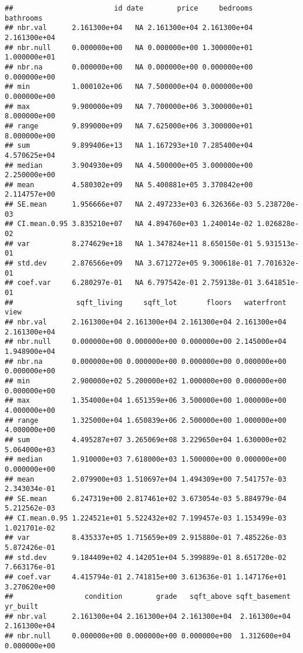\documentclass[
]{article}
\begin{document}
\begin{verbatim}
##                        id date        price     bedrooms    bathrooms
## nbr.val      2.161300e+04   NA 2.161300e+04 2.161300e+04 2.161300e+04
## nbr.null     0.000000e+00   NA 0.000000e+00 1.300000e+01 1.000000e+01
## nbr.na       0.000000e+00   NA 0.000000e+00 0.000000e+00 0.000000e+00
## min          1.000102e+06   NA 7.500000e+04 0.000000e+00 0.000000e+00
## max          9.900000e+09   NA 7.700000e+06 3.300000e+01 8.000000e+00
## range        9.899000e+09   NA 7.625000e+06 3.300000e+01 8.000000e+00
## sum          9.899406e+13   NA 1.167293e+10 7.285400e+04 4.570625e+04
## median       3.904930e+09   NA 4.500000e+05 3.000000e+00 2.250000e+00
## mean         4.580302e+09   NA 5.400881e+05 3.370842e+00 2.114757e+00
## SE.mean      1.956666e+07   NA 2.497233e+03 6.326366e-03 5.238720e-03
## CI.mean.0.95 3.835210e+07   NA 4.894760e+03 1.240014e-02 1.026828e-02
## var          8.274629e+18   NA 1.347824e+11 8.650150e-01 5.931513e-01
## std.dev      2.876566e+09   NA 3.671272e+05 9.300618e-01 7.701632e-01
## coef.var     6.280297e-01   NA 6.797542e-01 2.759138e-01 3.641851e-01
##               sqft_living     sqft_lot       floors   waterfront         view
## nbr.val      2.161300e+04 2.161300e+04 2.161300e+04 2.161300e+04 2.161300e+04
## nbr.null     0.000000e+00 0.000000e+00 0.000000e+00 2.145000e+04 1.948900e+04
## nbr.na       0.000000e+00 0.000000e+00 0.000000e+00 0.000000e+00 0.000000e+00
## min          2.900000e+02 5.200000e+02 1.000000e+00 0.000000e+00 0.000000e+00
## max          1.354000e+04 1.651359e+06 3.500000e+00 1.000000e+00 4.000000e+00
## range        1.325000e+04 1.650839e+06 2.500000e+00 1.000000e+00 4.000000e+00
## sum          4.495287e+07 3.265069e+08 3.229650e+04 1.630000e+02 5.064000e+03
## median       1.910000e+03 7.618000e+03 1.500000e+00 0.000000e+00 0.000000e+00
## mean         2.079900e+03 1.510697e+04 1.494309e+00 7.541757e-03 2.343034e-01
## SE.mean      6.247319e+00 2.817461e+02 3.673054e-03 5.884979e-04 5.212562e-03
## CI.mean.0.95 1.224521e+01 5.522432e+02 7.199457e-03 1.153499e-03 1.021701e-02
## var          8.435337e+05 1.715659e+09 2.915880e-01 7.485226e-03 5.872426e-01
## std.dev      9.184409e+02 4.142051e+04 5.399889e-01 8.651720e-02 7.663176e-01
## coef.var     4.415794e-01 2.741815e+00 3.613636e-01 1.147176e+01 3.270620e+00
##                 condition        grade   sqft_above sqft_basement     yr_built
## nbr.val      2.161300e+04 2.161300e+04 2.161300e+04  2.161300e+04 2.161300e+04
## nbr.null     0.000000e+00 0.000000e+00 0.000000e+00  1.312600e+04 0.000000e+00

\end{verbatim}
\end{document}
